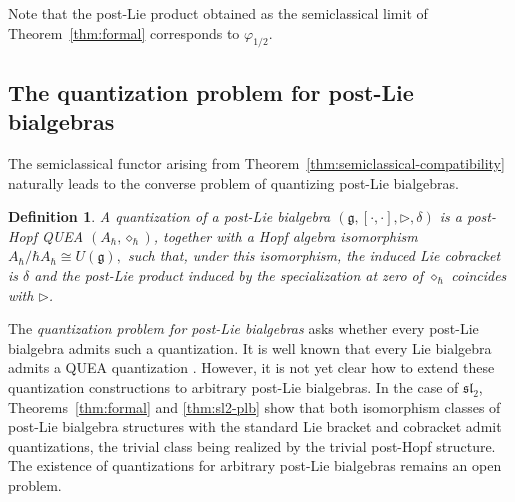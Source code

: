 \documentclass[11pt,english]{article}
\newcommand{\act}{\mathbin{\diamond}}
\newcommand{\tri}{\mathbin{\triangleright}}
\newtheorem{definition}[lemma]{Definition}
\theoremstyle{definition}
\begin{document}
Note that the post-Lie product obtained as the semiclassical
limit of Theorem~\ref{thm:formal} corresponds
to $\varphi_{1/2}$.


\subsection{The quantization problem for post-Lie bialgebras}
\label{subsec:quantization}

The semiclassical functor arising from
Theorem~\ref{thm:semiclassical-compatibility}
naturally leads to the converse problem
of quantizing post-Lie bialgebras.

\begin{definition}
A \emph{quantization} of a post-Lie bialgebra $(\mathfrak g,[\cdot,\cdot],\tri,\delta)$
is a post-Hopf QUEA $(A_\hbar,\act_\hbar)$,
together with a Hopf algebra isomorphism $A_\hbar/\hbar A_\hbar\cong U(\mathfrak g),$
such that, under this isomorphism, the induced Lie cobracket is
$\delta$ and the post-Lie product induced
by the specialization at zero of $\act_\hbar$ coincides
with $\tri$.
\end{definition}

The \emph{quantization problem for post-Lie
bialgebras} asks whether every post-Lie
bialgebra admits such a quantization.
It is well known that every Lie bialgebra admits
a QUEA quantization
\cite{EtingofKazhdan,Severa,RivezziSchnitzer}.
However, it is not yet clear how to extend
these quantization constructions to
arbitrary post-Lie bialgebras.
In the case of $\mathfrak{sl}_2$,
Theorems~\ref{thm:formal} and
\ref{thm:sl2-plb} show that both isomorphism
classes of post-Lie bialgebra structures
with the standard Lie bracket and cobracket
admit quantizations, the trivial class
being realized by the trivial post-Hopf
structure. The existence of quantizations
for arbitrary post-Lie bialgebras remains
an open problem.
\end{document}
